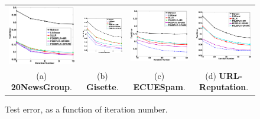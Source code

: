 \documentclass[10pt, conference, compsocconf]{IEEEtran}
\begin{document}
\begin{figure}[tb]
\begin{center}
\begin{tabular}{cccc}
   \includegraphics[height=4.cm,width=4.5cm]{img/20NewsGroup_accuracy_iteration.eps}&
   \hspace{-0.6cm}\includegraphics[height=4.cm,width=4.5cm]{img/Gisette_accuracy_iteration.eps}&
   \hspace{-0.6cm}\includegraphics[height=4.cm,width=4.5cm]{img/ECUESpam_accuracy_iteration.eps}&
   \hspace{-0.6cm}\includegraphics[height=4.cm,width=4.5cm]{img/URL-Reputation_accuracy_iteration.eps}\\
   (a) \textbf{20NewsGroup}. & \hspace{-0.3cm}(b) \textbf{Gisette}. & \hspace{-0.3cm}(c) \textbf{ECUESpam}. & \hspace{-0.3cm}(d) \textbf{URL-Reputation}.\\
   \end{tabular}
\end{center}\vspace{-0.3cm}
   \caption{Test error, as a function of iteration number.}\vspace{-0.5cm}
\label{fig:accuracy}
\end{figure}
\end{document}
